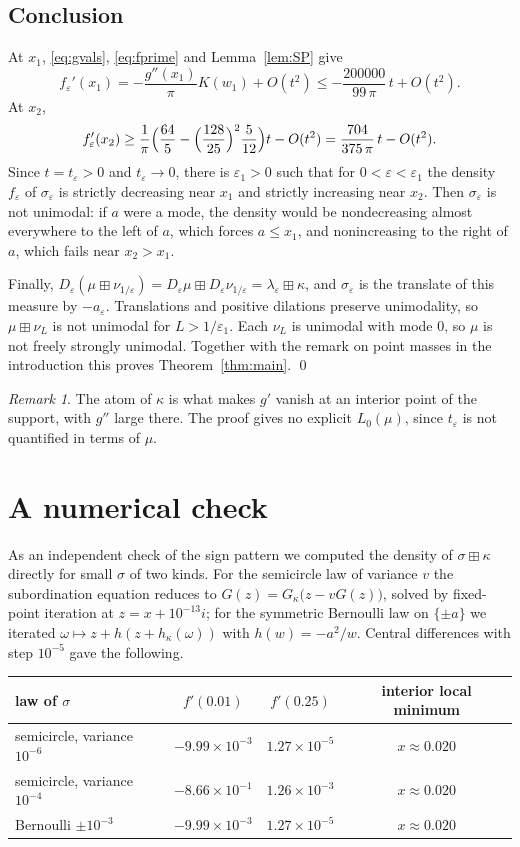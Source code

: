 \documentclass[11pt]{amsart}
\theoremstyle{definition}
\theoremstyle{remark}
\newtheorem{remark}[theorem]{Remark}
\numberwithin{equation}{section}
\newcommand{\bp}{\boxplus}
\newcommand{\eps}{\varepsilon}
\begin{document}
\subsection{Conclusion}
At $x_1$, \eqref{eq:gvals}, \eqref{eq:fprime} and Lemma~\ref{lem:SP} give
\[
f_\eps'(x_1)=-\frac{g''(x_1)}{\pi}K(w_1)+O(t^2)\le-\frac{200000}{99\,\pi}\,t+O(t^2).
\]
At $x_2$,
\[
f_\eps'(x_2)\ge\frac1\pi\Bigl(\frac{64}5-\Bigl(\frac{128}{25}\Bigr)^2\frac5{12}\Bigr)t-O(t^2)=\frac{704}{375\,\pi}\,t-O(t^2).
\]
Since $t=t_\eps>0$ and $t_\eps\to0$, there is $\eps_1>0$ such that for $0<\eps<\eps_1$ the density $f_\eps$ of $\sigma_\eps$ is strictly decreasing near $x_1$ and strictly increasing near $x_2$. Then $\sigma_\eps$ is not unimodal: if $a$ were a mode, the density would be nondecreasing almost everywhere to the left of $a$, which forces $a\le x_1$, and nonincreasing to the right of $a$, which fails near $x_2>x_1$.

Finally, $D_\eps(\mu\bp\nu_{1/\eps})=D_\eps\mu\bp D_\eps\nu_{1/\eps}=\lambda_\eps\bp\kappa$, and $\sigma_\eps$ is the translate of this measure by $-a_\eps$. Translations and positive dilations preserve unimodality, so $\mu\bp\nu_L$ is not unimodal for $L>1/\eps_1$. Each $\nu_L$ is unimodal with mode $0$, so $\mu$ is not freely strongly unimodal. Together with the remark on point masses in the introduction this proves Theorem~\ref{thm:main}. \qed

\begin{remark}
The atom of $\kappa$ is what makes $g'$ vanish at an interior point of the support, with $g''$ large there. The proof gives no explicit $L_0(\mu)$, since $t_\eps$ is not quantified in terms of $\mu$.
\end{remark}

\section{A numerical check}\label{sec:numerics}

As an independent check of the sign pattern we computed the density of $\sigma\bp\kappa$ directly for small $\sigma$ of two kinds. For the semicircle law of variance $v$ the subordination equation reduces to $G(z)=G_\kappa\bigl(z-vG(z)\bigr)$, solved by fixed-point iteration at $z=x+10^{-13}i$; for the symmetric Bernoulli law on $\{\pm a\}$ we iterated $\omega\mapsto z+h(z+h_\kappa(\omega))$ with $h(w)=-a^2/w$. Central differences with step $10^{-5}$ gave the following.

\begin{center}
\begin{tabular}{lccc}
law of $\sigma$ & $f'(0.01)$ & $f'(0.25)$ & interior local minimum\\\hline
semicircle, variance $10^{-6}$ & $-9.99\times10^{-3}$ & $1.27\times10^{-5}$ & $x\approx0.020$\\
semicircle, variance $10^{-4}$ & $-8.66\times10^{-1}$ & $1.26\times10^{-3}$ & $x\approx0.020$\\
Bernoulli $\pm10^{-3}$ & $-9.99\times10^{-3}$ & $1.27\times10^{-5}$ & $x\approx0.020$
\end{tabular}
\end{center}
\end{document}
